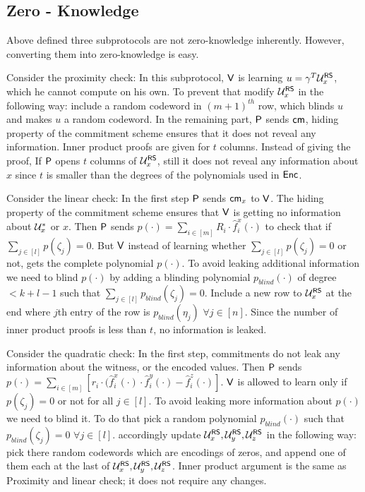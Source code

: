 \subsection{Zero - Knowledge}\label{subsec:zeroknowledge}
Above defined three subprotocols are not zero-knowledge inherently. However, converting them into zero-knowledge is easy. 

Consider the proximity check: In this subprotocol, $\mathsf{V}$ is learning $u = \gamma^T\mathcal{U}^{\mathsf{RS}}_{x}$, which he cannot compute on his own. To prevent that modify $\mathcal{U}^{\mathsf{RS}}_{x}$ in the following way: include a random codeword in $(m+1)^{th}$ row, which blinds $u$ and makes $u$ a random codeword. 
In the remaining part, $\mathsf{P}$ sends $\mathsf{cm}$, hiding property of the commitment scheme ensures that it does not reveal any information.
Inner product proofs are given for $t$ columns. Instead of giving the proof, If $\mathsf{P}$ opens $t$ columns of $\mathcal{U}^{\mathsf{RS}}_{x}$, still it does not reveal any information about $x$ since $t$ is smaller than the degrees of the polynomials used in $\mathsf{Enc}$.

Consider the linear check: In the first step $\mathsf{P}$ sends $\mathsf{cm}_x$ to $\mathsf{V}$. The hiding property of the commitment scheme ensures that $\mathsf{V}$ is getting no information about $\mathcal{U}^*_x$ or $x$.
Then $\mathsf{P}$ sends $p(\cdot) = \sum_{i\in[m]} R_i \cdot \hat{f}^x_i(\cdot)$ to check that if $\sum_{j\in [l]} p(\zeta_j) = 0$. But $\mathsf{V}$ instead of learning whether $\sum_{j\in[l]} p(\zeta_j) = 0$ or not, gets the complete polynomial $p(\cdot)$. To avoid leaking additional information we need to blind $p(\cdot)$ by adding a blinding polynomial $p_{blind}(\cdot)$ of degree $< k + l - 1$ such that $\sum_{j\in[l]} p_{blind}(\zeta_j) = 0$. Include a new row to $\mathcal{U}^{\mathsf{RS}}_x$ at the end where $j$th entry of the row is $p_{blind}(\eta_j)$ $\forall j\in [n]$.
Since the number of inner product proofs is less than $t$, no information is leaked.

Consider the quadratic check: In the first step, commitments do not leak any information about the witness, or the encoded values.
Then $\mathsf{P}$ sends $p(\cdot) = \sum_{i\in[m]} [r_i\cdot (\hat{f}^x_i(\cdot)\cdot \hat{f}^y_i(\cdot) - \hat{f}^z_i(\cdot)]$. $\mathsf{V}$ is allowed to learn only if $p(\zeta_j)=0$ or not for all $j\in[l]$. To avoid leaking more information about $p(\cdot)$ we need to blind it. To do that pick a random polynomial $p_{blind}(\cdot)$ such that $p_{blind}(\zeta_j) = 0$ $\forall j\in [l]$. accordingly update $\mathcal{U}^{\mathsf{RS}}_x, \mathcal{U}^{\mathsf{RS}}_y,\mathcal{U}^{\mathsf{RS}}_z$ in the following way: pick there random codewords which are encodings of zeros, and append one of them each at the last of $\mathcal{U}^{\mathsf{RS}}_{x}, \mathcal{U}^{\mathsf{RS}}_{y}, \mathcal{U}^{\mathsf{RS}}_{z}$.
Inner product argument is the same as Proximity and linear check; it does not require any changes. 

